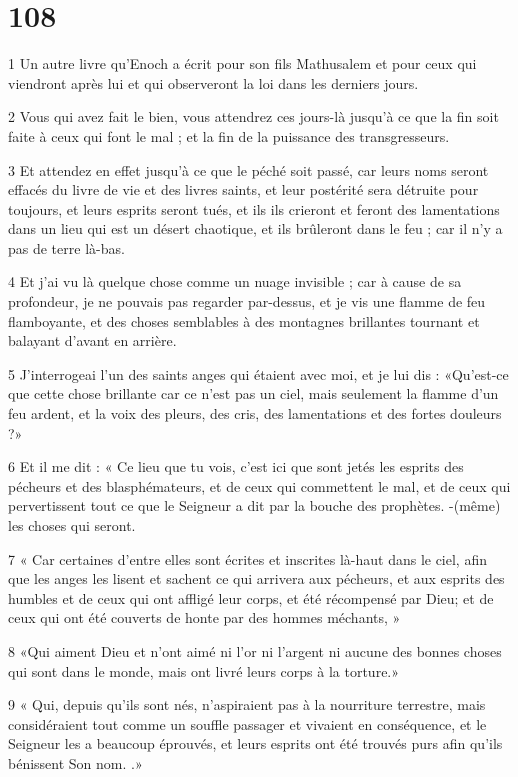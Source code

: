 \chapter{108}

\par 1 Un autre livre qu'Enoch a écrit pour son fils Mathusalem et pour ceux qui viendront après lui et qui observeront la loi dans les derniers jours.
\par 2 Vous qui avez fait le bien, vous attendrez ces jours-là jusqu'à ce que la fin soit faite à ceux qui font le mal ; et la fin de la puissance des transgresseurs.
\par 3 Et attendez en effet jusqu'à ce que le péché soit passé, car leurs noms seront effacés du livre de vie et des livres saints, et leur postérité sera détruite pour toujours, et leurs esprits seront tués, et ils ils crieront et feront des lamentations dans un lieu qui est un désert chaotique, et ils brûleront dans le feu ; car il n’y a pas de terre là-bas.
\par 4 Et j'ai vu là quelque chose comme un nuage invisible ; car à cause de sa profondeur, je ne pouvais pas regarder par-dessus, et je vis une flamme de feu flamboyante, et des choses semblables à des montagnes brillantes tournant et balayant d'avant en arrière.
\par 5 J'interrogeai l'un des saints anges qui étaient avec moi, et je lui dis : «Qu'est-ce que cette chose brillante car ce n'est pas un ciel, mais seulement la flamme d'un feu ardent, et la voix des pleurs, des cris, des lamentations et des fortes douleurs ?»
\par 6 Et il me dit : « Ce lieu que tu vois, c'est ici que sont jetés les esprits des pécheurs et des blasphémateurs, et de ceux qui commettent le mal, et de ceux qui pervertissent tout ce que le Seigneur a dit par la bouche des prophètes. -(même) les choses qui seront.
\par 7 « Car certaines d'entre elles sont écrites et inscrites là-haut dans le ciel, afin que les anges les lisent et sachent ce qui arrivera aux pécheurs, et aux esprits des humbles et de ceux qui ont affligé leur corps, et été récompensé par Dieu; et de ceux qui ont été couverts de honte par des hommes méchants, »
\par 8 «Qui aiment Dieu et n'ont aimé ni l'or ni l'argent ni aucune des bonnes choses qui sont dans le monde, mais ont livré leurs corps à la torture.»
\par 9 « Qui, depuis qu'ils sont nés, n'aspiraient pas à la nourriture terrestre, mais considéraient tout comme un souffle passager et vivaient en conséquence, et le Seigneur les a beaucoup éprouvés, et leurs esprits ont été trouvés purs afin qu'ils bénissent Son nom. .»
